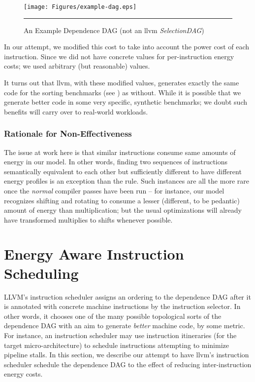 \begin{figure}[htbp]
  \centering
  \texttt{[image: Figures/example-dag.eps]}
  \rule{35em}{0.3pt}
  \caption{An Example Dependence DAG (not an llvm
    \textit{SelectionDAG})}
  \label{fig:example-dag}
\end{figure}

In our attempt, we modified this cost to take into account the power
cost of each instruction.  Since we did not have concrete values for
per-instruction energy costs; we used arbitrary (but reasonable)
values.

It turns out that llvm, with these modified values, generates exactly
the same code for the sorting benchmarks (see
) as without.  While it is possible
that we generate better code in some very specific, synthetic
benchmarks; we doubt such benefits will carry over to real-world
workloads.

\subsubsection{Rationale for Non-Effectiveness}

The issue at work here is that similar instructions consume same
amounts of energy in our model.  In other words, finding two sequences
of instructions semantically equivalent to each other but sufficiently
different to have different energy profiles is an exception than the
rule.  Such instances are all the more rare once the \textit{normal}
compiler passes have been run -- for instance, our model recognizes
shifting and rotating to consume a lesser (different, to be pedantic)
amount of energy than multiplication; but the usual optimizations will
already have transformed multiplies to shifts whenever possible.

\section{Energy Aware Instruction Scheduling}

LLVM's instruction scheduler assigns an ordering to the dependence DAG
after it is annotated with concrete machine instructions by the
instruction selector.  In other words, it chooses one of the many
possible topological sorts of the dependence DAG with an aim to
generate \textit{better} machine code, by some metric.  For instance,
an instruction scheduler may use instruction itineraries (for the
target micro-architecture) to schedule instructions attempting to
minimize pipeline stalls.  In this section, we describe our attempt to
have llvm's instruction scheduler schedule the dependence DAG to the
effect of reducing inter-instruction energy costs.

